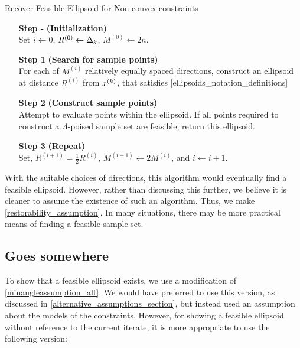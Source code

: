 \begin{algorithm}[H]
    \caption{Recover Feasible Ellipsoid for Non convex constraints}	
    \label{general_recover}
    \begin{itemize}
        \item[\textbf{Step -}] \textbf{(Initialization)} \\
        		Set $i\gets0$, $R^{(0)} \gets \Delta_k$, $M^{(0)} \gets 2n$.
        		
        \item[\textbf{Step 1}] \textbf{(Search for sample points)} \\
        	For each of $M^{(i)}$ relatively equally spaced directions,
        	construct an ellipsoid at distance $R^{(i)}$ from $x^{(k)}$, that satisfies \cref{ellipsoids_notation_definitions}
        	
        \item[\textbf{Step 2}] \textbf{(Construct sample points)} \\
        	Attempt to evaluate points within the ellipsoid.
        	If all points required to construct a $\Lambda$-poised sample set are feasible, return this ellipsoid.
        \item[\textbf{Step 3}] \textbf{(Repeat)} \\
        	Set, $R^{(i+1)} = \frac 1 2 R^{(i)}$, $M^{(i+1)} \gets 2 M^{(i)}$, and $i \gets i + 1$.
    \end{itemize}
\end{algorithm}

With the suitable choices of directions, this algorithm would eventually find a feasible ellipsoid.
However, rather than discussing this further, we believe it is cleaner to assume the existence of such an algorithm.
Thus, we make \cref{restorability_assumption}.
In many situations, there may be more practical means of finding a feasible sample set.





\subsection{Goes somewhere}




To show that a feasible ellipsoid exists, we use a modification of \cref{minangleassumption_alt}.
We would have preferred to use this version, as discussed in \cref{alternative_assumptions_section},
but instead used an assumption about the models of the constraints.
However, for showing a feasible ellipsoid without reference to the current iterate, it is more appropriate to use the following version:


